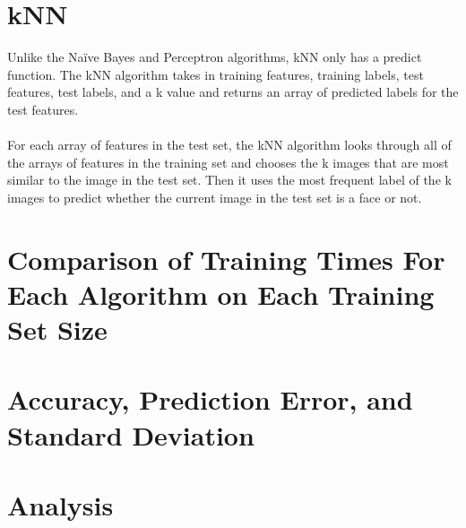 \documentclass{article}
\begin{document}

\section{kNN}

Unlike the Naïve Bayes and Perceptron algorithms, kNN only has a predict function. The kNN algorithm takes in training features, training labels, test features, test labels, and a k value and returns an array of predicted labels for the test features. \\\\
For each array of features in the test set, the kNN algorithm looks through all of the arrays of features in the training set and chooses the k images that are most similar to the image in the test set. Then it uses the most frequent label of the k images to predict whether the current image in the test set is a face or not. 


\section{Comparison of Training Times For Each Algorithm on Each Training Set Size}



\section{Accuracy, Prediction Error, and Standard Deviation}


\section{Analysis}
\end{document}
